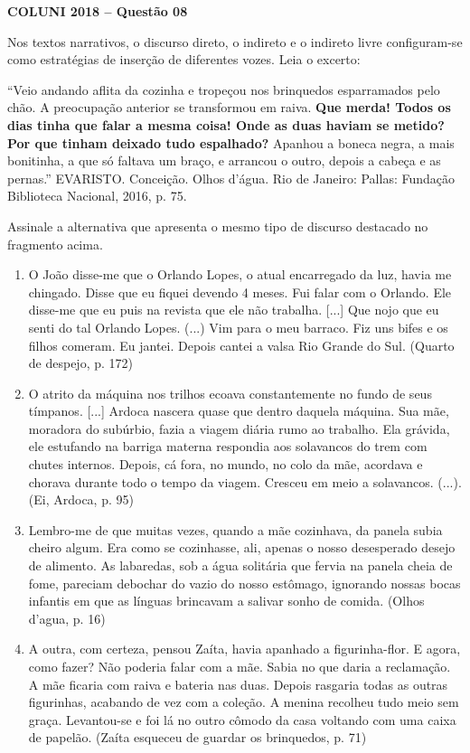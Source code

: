\textbf{COLUNI 2018 -- Questão 08}\par\medskip Nos textos narrativos, o discurso direto, o indireto e o indireto livre configuram-se como estratégias de inserção de diferentes vozes. Leia o excerto:

\par

“Veio andando aflita da cozinha e tropeçou nos brinquedos esparramados pelo chão. A preocupação anterior se transformou em raiva. \textbf{Que merda! Todos os dias tinha que falar a mesma coisa! Onde as duas haviam se metido? Por que tinham deixado tudo espalhado?} Apanhou a boneca negra, a mais bonitinha, a que só faltava um braço, e arrancou o outro, depois a cabeça e as pernas.” EVARISTO. Conceição. Olhos d’água. Rio de Janeiro: Pallas: Fundação Biblioteca Nacional, 2016, p. 75.

\par

Assinale a alternativa que apresenta o mesmo tipo de discurso destacado no fragmento acima.\begin{enumerate}
\item O João disse-me que o Orlando Lopes, o atual encarregado da luz, havia me chingado. Disse que eu
      fiquei devendo 4 meses. Fui falar com o Orlando. Ele disse-me que eu puis na revista que ele não
      trabalha. [...] Que nojo que eu senti do tal Orlando Lopes. (...) Vim para o meu barraco. Fiz uns bifes e os
      filhos comeram. Eu jantei. Depois cantei a valsa Rio Grande do Sul. (Quarto de despejo, p. 172)
\item O atrito da máquina nos trilhos ecoava constantemente no fundo de seus tímpanos. [...] Ardoca nascera
      quase que dentro daquela máquina. Sua mãe, moradora do subúrbio, fazia a viagem diária rumo ao
      trabalho. Ela grávida, ele estufando na barriga materna respondia aos solavancos do trem com chutes
      internos. Depois, cá fora, no mundo, no colo da mãe, acordava e chorava durante todo o tempo da
      viagem. Cresceu em meio a solavancos. (...). (Ei, Ardoca, p. 95)
\item Lembro-me de que muitas vezes, quando a mãe cozinhava, da panela subia cheiro algum. Era como se
      cozinhasse, ali, apenas o nosso desesperado desejo de alimento. As labaredas, sob a água solitária que
      fervia na panela cheia de fome, pareciam debochar do vazio do nosso estômago, ignorando nossas bocas
      infantis em que as línguas brincavam a salivar sonho de comida. (Olhos d’agua, p. 16)
\item A outra, com certeza, pensou Zaíta, havia apanhado a figurinha-flor. E agora, como fazer? Não poderia
      falar com a mãe. Sabia no que daria a reclamação. A mãe ficaria com raiva e bateria nas duas. Depois
      rasgaria todas as outras figurinhas, acabando de vez com a coleção. A menina recolheu tudo meio sem
      graça. Levantou-se e foi lá no outro cômodo da casa voltando com uma caixa de papelão. (Zaíta
      esqueceu de guardar os brinquedos, p. 71)\end{enumerate}
